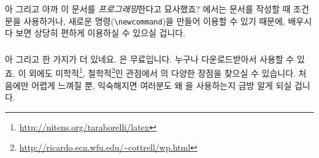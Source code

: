 아 그리고 아까 \lt 이 문서를 \emph{프로그래밍}한다고 묘사했죠?
\lt 에서는 문서를 작성할 때 조건문을 사용하거나, 새로운 명령(\verb|\newcommand|)을 만들어 이용할 수 있기 때문에, 배우시다 보면 상당히 편하게 이용하실 수 있으실 겁니다. 

\subsubsection*{}
아 그리고 한 가지가 더 있네요.
\lt 은 무료입니다.
누구나 다운로드받아서 사용할 수 있죠.
이 외에도 미학적\footnote{\url{http://nitens.org/taraborelli/latex}}, 철학적\footnote{\url{http://ricardo.ecn.wfu.edu/~cottrell/wp.html}}인 관점에서 \lt 의 다양한 장점을 찾으실 수 있습니다.
처음에만 어렵게 느껴질 뿐, 익숙해지면 여러분도 왜 \lt 을 사용하는지 금방 알게 되실 겁니다.

